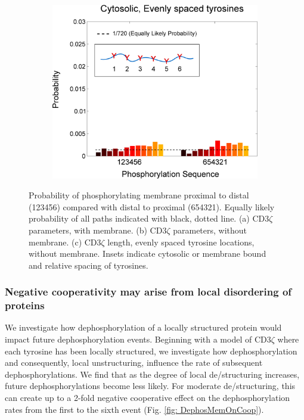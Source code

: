\documentclass[../../AdvancementSummary.tex]{subfiles}
\begin{document}
\begin{figure}[H]
\begin{center}
\begin{subfigure}{0.3\linewidth}
			\caption{}
		\end{subfigure}
		\begin{subfigure}{0.3\linewidth}
			\includegraphics[width=\linewidth]{ResultsFigures/StiffeningSequentialBinding/EvenSites/ProbVSSequence.eps}
			\caption{}
		\end{subfigure}
	\end{center}
	\caption{Probability of phosphorylating membrane proximal to distal (123456) compared with distal to proximal (654321). Equally likely probability of all paths indicated with black, dotted line. (a) CD3$\zeta$ parameters, with membrane. (b) CD3$\zeta$ parameters, without membrane. (c) CD3$\zeta$ length, evenly spaced tyrosine locations, without membrane. Insets indicate cytosolic or membrane bound and relative spacing of tyrosines. \label{fig: StiffeningSeqBind}}
\end{figure}

\subsubsection{Negative cooperativity may arise from local disordering of proteins}

We investigate how dephosphorylation of a locally structured protein would impact future dephosphorylation events. Beginning with a model of CD3$\zeta$ where each tyrosine has been locally structured, we investigate how dephosphorylation and consequently, local unstructuring, influence the rate of subsequent dephosphorylations. We find that as the degree of local de/structuring increases, future dephosphorylations become less likely. For moderate de/structuring, this can create up to a 2-fold negative cooperative effect on the dephosphorylation rates from the first to the sixth event (Fig. \ref{fig: DephosMemOnCoop}).
\end{document}
